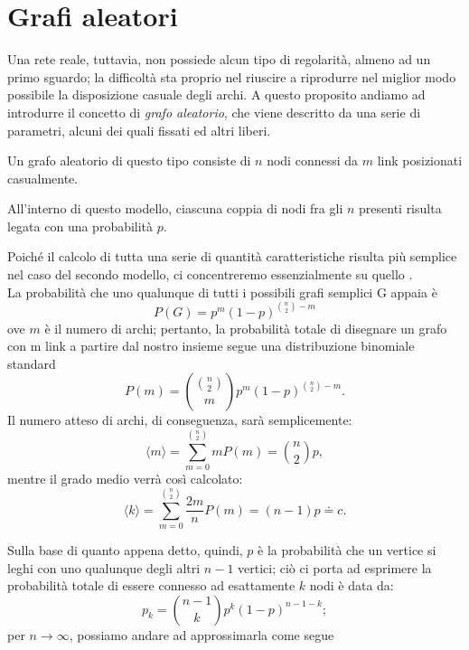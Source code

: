 \section{Grafi aleatori}
Una rete reale, tuttavia, non possiede alcun tipo di regolarità, almeno ad un primo sguardo; la difficoltà sta proprio nel riuscire a riprodurre nel miglior modo possibile la disposizione casuale degli archi. A questo proposito andiamo ad introdurre il concetto di \emph{grafo aleatorio}, che viene descritto da una serie di parametri, alcuni dei quali fissati ed altri liberi.
\begin{definizione}
Un grafo aleatorio di questo tipo consiste di $ n $ nodi connessi da $ m $ link posizionati casualmente.
\end{definizione}
\begin{definizione}
All'interno di questo modello, ciascuna coppia di nodi fra gli $ n $ presenti risulta legata con una probabilità $ p $.
\end{definizione}
Poiché il calcolo di tutta una serie di quantità caratteristiche risulta più semplice nel caso del secondo modello, ci concentreremo essenzialmente su quello \cite{Barabasi}. \\
La probabilità che uno qualunque di tutti i possibili grafi semplici G appaia è
\begin{equation}
P \left(G \right) = p^m \left( 1 - p \right)^{\binom{n}{2} - m}
\end{equation}
ove $ m $ è il numero di archi; pertanto, la probabilità totale di disegnare un grafo con m link a partire dal nostro insieme segue una distribuzione binomiale standard
\begin{equation}
P \left(m \right) = \binom{\binom{n}{2}}{m} p^m \left( 1 - p \right)^{\binom{n}{2} - m}.
\end{equation}
Il numero atteso di archi, di conseguenza, sarà semplicemente:
\begin{equation}
\langle m \rangle = \sum_{m=0}^{\binom{n}{2}} m P \left(m \right) = \binom{n}{2} p,
\end{equation}
mentre il grado medio verrà così calcolato:
\begin{equation}
\langle k \rangle = \sum_{m=0}^{{\binom{n}{2}}} \frac{2m}{n} P \left(m \right) = \left( n - 1 \right) p \doteq c.
\end{equation}

Sulla base di quanto appena detto, quindi, $ p $ è la probabilità che un vertice si leghi con uno qualunque degli altri $ n - 1 $ vertici; ciò ci porta ad esprimere la probabilità totale di essere connesso ad esattamente $ k $ nodi è data da:
\begin{equation}
p_k = \binom{n - 1}{k} p^k \left(1 - p \right)^{n - 1 - k};
\end{equation} 
per $ n \rightarrow \infty $, possiamo andare ad approssimarla come segue

